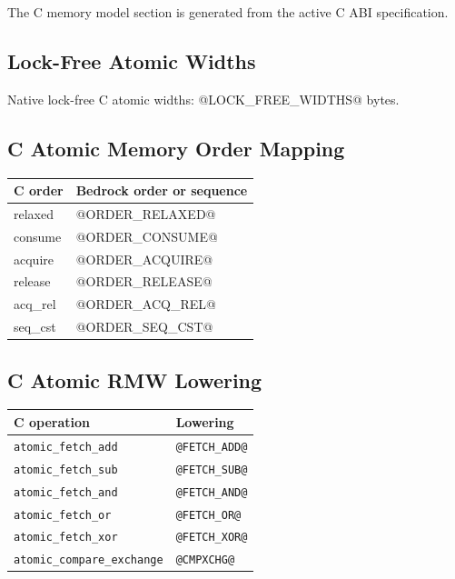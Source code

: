 The C memory model section is generated from the active C ABI specification.

\subsection{Lock-Free Atomic Widths}
Native lock-free C atomic widths: @LOCK_FREE_WIDTHS@ bytes.

\subsection{C Atomic Memory Order Mapping}
\begingroup\footnotesize
\setlength{\tabcolsep}{2pt}
\begin{longtable}{@{}p{1.55in}p{3.95in}@{}}
\toprule
\textbf{C order} & \textbf{Bedrock order or sequence}\\
\midrule
\endhead
relaxed & @ORDER_RELAXED@\\
consume & @ORDER_CONSUME@\\
acquire & @ORDER_ACQUIRE@\\
release & @ORDER_RELEASE@\\
acq\_rel & @ORDER_ACQ_REL@\\
seq\_cst & @ORDER_SEQ_CST@\\
\bottomrule
\end{longtable}
\endgroup

\subsection{C Atomic RMW Lowering}
\begingroup\footnotesize
\setlength{\tabcolsep}{2pt}
\begin{longtable}{@{}p{2.15in}p{3.35in}@{}}
\toprule
\textbf{C operation} & \textbf{Lowering}\\
\midrule
\endhead
\texttt{atomic\_fetch\_add} & \texttt{@FETCH_ADD@}\\
\texttt{atomic\_fetch\_sub} & \texttt{@FETCH_SUB@}\\
\texttt{atomic\_fetch\_and} & \texttt{@FETCH_AND@}\\
\texttt{atomic\_fetch\_or} & \texttt{@FETCH_OR@}\\
\texttt{atomic\_fetch\_xor} & \texttt{@FETCH_XOR@}\\
\texttt{atomic\_compare\_exchange} & \texttt{@CMPXCHG@}\\
\bottomrule
\end{longtable}
\endgroup
